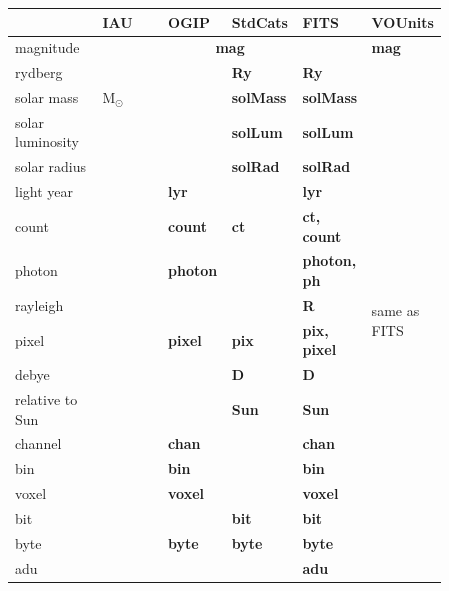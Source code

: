 \documentclass[11pt,notitlepage,onecolumn]{ivoa}
\newcommand{\unit}[1]{\textbf{\textsf{\color{orange}#1}}}
\begin{document}
\begin{table}
\begin{tabular}{|p{0.2\linewidth}|p{0.15\linewidth}|p{0.12\linewidth}|p{0.12\linewidth}|p{0.12\linewidth}|p{0.15\linewidth}|}
\hline
    & IAU & OGIP  & StdCats & FITS  & VOUnits\\\hline
    magnitude & \multicolumn{4}{c|}{\unit{mag}} & \unit{mag}\\\hline
    rydberg & \unit{} & \unit{} & \unit{Ry} & \unit{Ry} & \multirow{19}{0.15\linewidth}{same as FITS} \\\hline
    solar mass & \unit{$\mathrm{M}_\odot$} &  & \unit{solMass} & \unit{solMass} &\\\cline{1-5}
    solar luminosity & \unit{} & \unit{} & \unit{solLum} & \unit{solLum} &\\\cline{1-5}
    solar radius & \unit{} & \unit{} & \unit{solRad} & \unit{solRad} &\\\cline{1-5}
    light year & \unit{} & \unit{lyr} & \unit{} & \unit{lyr} &\\\cline{1-5}
    count & \unit{} & \unit{count} & \unit{ct} & \unit{ct, count} &\\\cline{1-5}
    photon & \unit{} & \unit{photon} & \unit{} & \unit{photon, ph} &\\\cline{1-5}
    rayleigh & \unit{} & \unit{} & \unit{} & \unit{R} &\\\cline{1-5}
    pixel & \unit{} & \unit{pixel} & \unit{pix} & \unit{pix, pixel} &\\\cline{1-5}
    debye & \unit{} & \unit{} & \unit{D} & \unit{D} &\\\cline{1-5}
    relative to Sun & \unit{} & \unit{} & \unit{Sun} & \unit{Sun} &\\\cline{1-5}
    channel & \unit{} & \unit{chan} & \unit{} & \unit{chan} &\\\cline{1-5}
    bin & \unit{} & \unit{bin} & \unit{} & \unit{bin} &\\\cline{1-5}
    voxel & \unit{} & \unit{voxel} & \unit{} & \unit{voxel} &\\\cline{1-5}
    bit & \unit{} & \unit{} & \unit{bit} & \unit{bit} &\\\cline{1-5}
    byte & \unit{} & \unit{byte} & \unit{byte} & \unit{byte} &\\\cline{1-5}
    adu & \unit{} & \unit{} & \unit{} & \unit{adu} &\\\cline{1-5}

\end{tabular}
\end{table}
\end{document}
